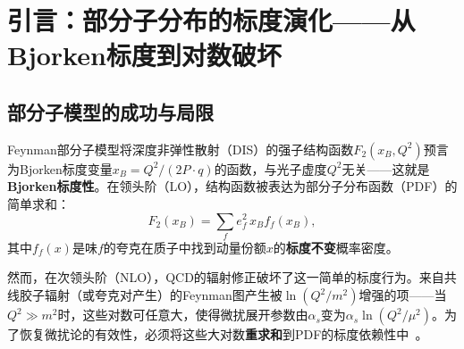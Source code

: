 \documentclass[12pt,a4paper]{ctexart}
\theoremstyle{definition}
\begin{document}
\begin{abstract}
\textbf{第三层——DGLAP与OPE的等价性：}利用Peskin与Schroeder第18章的算符乘积展开（OPE）分析，证明DGLAP方程的$n$次矩解与leading-twist算符的反常维数矩阵$\gamma^{(n)}$精确对应。演示$\int_0^1 dz\,z^{n-1}P_{q\leftarrow q}(z)$的计算过程，揭示DGLAP劈裂函数的矩$\leftrightarrow$算符反常维数这一深刻关系。

\textbf{第四层——格点QCD中DGLAP初始条件的计算：}阐述LaMET框架和准PDF方法如何从格点QCD的等时空间关联函数中提取PDF。重点分析Su等人（2023）的重整化群重求和（RGR）方案——揭示准PDF匹配核中大对数$\ln(\mu^2/(2xP_z)^2)$的起源及其与DGLAP对数的精确对应关系：准PDF的\textbf{内禀物理标度}为$Q_{\text{eff}} = 2xP_z$，通过DGLAP演化从$Q_{\text{eff}}$到参考标度$\mu = 2$~GeV实现RGR匹配。阐述小$x$处$\alpha_s(2xP_z)$进入非微扰区域导致的匹配失效。

\textbf{第五层——格点PDF的唯象学影响：}以NNPDF4.0的全局分析为背景，展示格点QCD提供的DGLAP初始条件如何可能打破唯象学拟合中$(x,Q^2)$简并，从而提升大$x$区域和小$x$区域的PDF精度。讨论格点PDF与实验DGLAP演化的协同——``理论先验+实验演化''的闭环。

全篇以统一的数学语言（劈裂函数、反常维数、重求和群）将微扰QCD的经典DGLAP理论与格点QCD的前沿计算编织成一个有机整体。
\end{abstract}

\tableofcontents
\newpage

\section{引言：部分子分布的标度演化——从Bjorken标度到对数破坏}

\subsection{部分子模型的成功与局限}

Feynman部分子模型将深度非弹性散射（DIS）的强子结构函数$F_2(x_B, Q^2)$预言为Bjorken标度变量$x_B = Q^2/(2P\cdot q)$的函数，与光子虚度$Q^2$无关——这就是\textbf{Bjorken标度性}。在领头阶（LO），结构函数被表达为部分子分布函数（PDF）的简单求和：
\begin{equation}
F_2(x_B) = \sum_f e_f^2\, x_B f_f(x_B),
\label{eq:bjorken_scaling}
\end{equation}
其中$f_f(x)$是味$f$的夸克在质子中找到动量份额$x$的\textbf{标度不变}概率密度。

然而，在次领头阶（NLO），QCD的辐射修正破坏了这一简单的标度行为。来自共线胶子辐射（或夸克对产生）的Feynman图产生被$\ln(Q^2/m^2)$增强的项——当$Q^2 \gg m^2$时，这些对数可任意大，使得微扰展开参数由$\alpha_s$变为$\alpha_s \ln(Q^2/\mu^2)$。为了恢复微扰论的有效性，必须将这些大对数\textbf{重求和}到PDF的标度依赖性中~\cite{PeskinSchroeder1995}。
\end{document}
